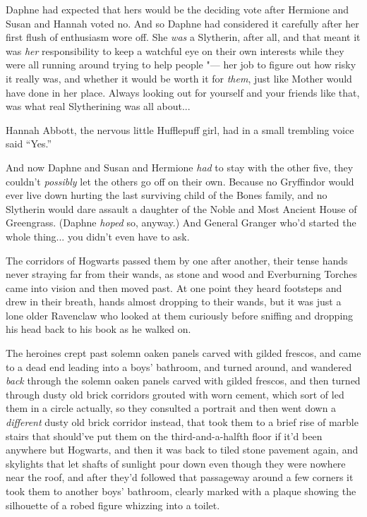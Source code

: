 Daphne had expected that hers would be the deciding vote after Hermione
and Susan and Hannah voted no. And so Daphne had considered it carefully
after her first flush of enthusiasm wore off. She \emph{was} a
Slytherin, after all, and that meant it was \emph{her} responsibility to
keep a watchful eye on their own interests while they were all running
around trying to help people "--- her job to figure out how risky it really
was, and whether it would be worth it for \emph{them}, just like Mother
would have done in her place. Always looking out for yourself and your
friends like that, was what real Slytherining was all about...

Hannah Abbott, the nervous little Hufflepuff girl, had in a small
trembling voice said ``Yes.''

And now Daphne and Susan and Hermione \emph{had} to stay with the other
five, they couldn't \emph{possibly} let the others go off on their own.
Because no Gryffindor would ever live down hurting the last surviving
child of the Bones family, and no Slytherin would dare assault a
daughter of the Noble and Most Ancient House of Greengrass. (Daphne
\emph{hoped} so, anyway.) And General Granger who'd started the whole
thing... you didn't even have to ask.

The corridors of Hogwarts passed them by one after another, their tense
hands never straying far from their wands, as stone and wood and
Everburning Torches came into vision and then moved past. At one point
they heard footsteps and drew in their breath, hands almost dropping to
their wands, but it was just a lone older Ravenclaw who looked at them
curiously before sniffing and dropping his head back to his book as he
walked on.

The heroines crept past solemn oaken panels carved with gilded frescos,
and came to a dead end leading into a boys' bathroom, and turned around,
and wandered \emph{back} through the solemn oaken panels carved with
gilded frescos, and then turned through dusty old brick corridors
grouted with worn cement, which sort of led them in a circle actually,
so they consulted a portrait and then went down a \emph{different} dusty
old brick corridor instead, that took them to a brief rise of marble
stairs that should've put them on the third-and-a-halfth floor if it'd
been anywhere but Hogwarts, and then it was back to tiled stone pavement
again, and skylights that let shafts of sunlight pour down even though
they were nowhere near the roof, and after they'd followed that
passageway around a few corners it took them to another boys' bathroom,
clearly marked with a plaque showing the silhouette of a robed figure
whizzing into a toilet.

